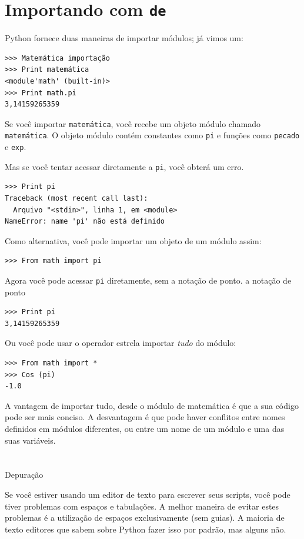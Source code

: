 \documentclass[10pt]{book}
\begin{document}
\section{Importando com {\tt de}}

Python fornece duas maneiras de importar módulos; já vimos um:

\begin{verbatim}
>>> Matemática importação
>>> Print matemática
<module'math' (built-in)>
>>> Print math.pi
3,14159265359
\end{verbatim}
%
Se você importar {\tt matemática}, você recebe um objeto módulo chamado {\tt matemática}.
O objeto módulo contém constantes como {\tt pi} e funções
como {\tt pecado} e {\tt exp}.

Mas se você tentar acessar diretamente a {\tt pi}, você obterá um erro.

\begin{verbatim}
>>> Print pi
Traceback (most recent call last):
  Arquivo "<stdin>", linha 1, em <module>
NameError: name 'pi' não está definido
\end{verbatim}
%
Como alternativa, você pode importar um objeto de um módulo assim:

\begin{verbatim}
>>> From math import pi
\end{verbatim}
%
Agora você pode acessar {\tt pi} diretamente, sem a notação de ponto.
\index{} a notação de ponto

\begin{verbatim}
>>> Print pi
3,14159265359
\end{verbatim}
%
Ou você pode usar o operador estrela importar {\it tudo} do
módulo:

\begin{verbatim}
>>> From math import *
>>> Cos (pi)
-1.0
\end{verbatim}

A vantagem de importar tudo, desde o módulo de matemática é que a sua
código pode ser mais conciso. A desvantagem é que pode haver
conflitos entre nomes definidos em módulos diferentes, ou entre
um nome de um módulo e uma das suas variáveis.


\section{} Depuração
\label{editor}

Se você estiver usando um editor de texto para escrever seus scripts, você pode
tiver problemas com espaços e tabulações. A melhor maneira de evitar
estes problemas é a utilização de espaços exclusivamente (sem guias). A maioria de texto
editores que sabem sobre Python fazer isso por padrão, mas alguns
não.
\end{document}
